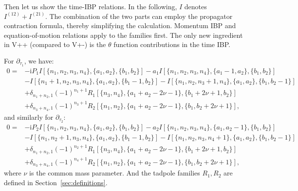 \documentclass[a4paper]{article}
\def\pd{\partial}
\def\ii{\mathrm{i}}
\def\to{\rightarrow}
\begin{document}


Then let us show the time-IBP relations.
In the following, $I$ denotes $I^{(12)}+I^{(21)}$. The combination of the two parts can employ the propagator contraction formula, thereby simplifying the calculation. Momentum IBP and equation-of-motion relations apply to the families first. The only new ingredient in V++ (compared to V+-) is the $\theta$ function contributions in the time IBP.

For $\pd_{\tau_1}$, we have:
\begin{align}
	0 = & - \ii P_1 I[\{n_1,n_2,n_3,n_4\},\{a_1,a_2\},\{b_1,b_2\}] - a_1I[\{n_1,n_2,n_3,n_4\},\{a_1-1,a_2\},\{b_1,b_2\}]\nonumber \\
	    & - I[\{n_1+1,n_2,n_3,n_4\},\{a_1,a_2\},\{b_1-1,b_2\}] - I[\{n_1,n_2,n_3+1,n_4\},\{a_1,a_2\},\{b_1,b_2-1\}]\nonumber      \\
	    & +\delta_{n_1+n_2,1}(-1)^{n_1+1}R_1[\{n_3,n_4\},\{a_1+a_2-2\nu-1\},\{b_1+2\nu+1,b_2\}]\nonumber                \\
	    & +\delta_{n_3+n_4,1}(-1)^{n_3+1}R_2[\{n_1,n_2\},\{a_1+a_2-2\nu-1\},\{b_1,b_2+2\nu+1\}], \label{eq:timeIBP_tau1}
\end{align}
and similarly for $\partial_{\tau_2}$:
\begin{align}
	0 = & - \ii P_2 I[\{n_1,n_2,n_3,n_4\},\{a_1,a_2\},\{b_1,b_2\}] - a_2I[\{n_1,n_2,n_3,n_4\},\{a_1,a_2-1\},\{b_1,b_2\}]\nonumber \\
	    & - I[\{n_1,n_2+1,n_3,n_4\},\{a_1,a_2\},\{b_1-1,b_2\}] - I[\{n_1,n_2,n_3,n_4+1\},\{a_1,a_2\},\{b_1,b_2-1\}]\nonumber      \\
	    & +\delta_{n_1+n_2,1}(-1)^{n_2+1}R_1[\{n_3,n_4\},\{a_1+a_2-2\nu-1\},\{b_1+2\nu+1,b_2\}]\nonumber                \\
	    & +\delta_{n_3+n_4,1}(-1)^{n_4+1}R_2[\{n_1,n_2\},\{a_1+a_2-2\nu-1\},\{b_1,b_2+2\nu+1\}], \label{eq:timeIBP_tau2}
\end{align}
where $\nu$ is the common mass parameter. And the tadpole families $R_1,R_2$ are defined in Section~\ref{sec:definitions}.
\end{document}
